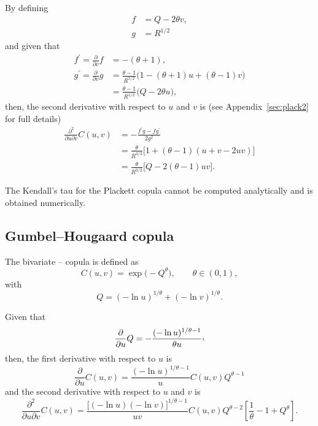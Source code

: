 \documentclass{article}
\def\ccom{\raisebox{.45ex}{\textrm{,}}}
\begin{document}
By defining
\begin{align}
    f &= Q - 2 \theta v,\\
    g &= R^{1/2}
\end{align}
and given that
\begin{align}
    f^\prime = \frac{\partial}{\partial v} f &= -(\theta + 1),\\
    g^\prime = \frac{\partial}{\partial v} g &= \frac{\theta-1}{R^{1/2}} \Big(
        1 - (\theta+1) u + (\theta-1) v \Big)
                \nonumber\\
         &= \frac{\theta-1}{R^{1/2}} \Big(Q - 2 \theta u \Big),
\end{align}
then, the second derivative with respect to $u$ and $v$ is 
  (see Appendix~\ref{sec:plack2} for full details)
\begin{align}
    \frac{\partial^2}{\partial u\partial v}C(u,v)
        &= - \frac{f^\prime g - fg^\prime}{2 g^2}
        \nonumber\\
        &= \frac\theta{R^{3/2}}\Big[
            1 + (\theta-1)(u+v-2uv)\Big]
        \nonumber\\
        &= \frac\theta{R^{3/2}}\Big[
            Q - 2(\theta-1)uv\Big].
\end{align}


The Kendall's tau for the Plackett copula cannot be computed analytically
  and is obtained numerically.




\subsection*{Gumbel--Hougaard copula}
The bivariate \cite{Gumbel60}--\cite{Hougaard86} copula is defined as
\begin{equation}
    C(u,v)= \exp\Big(-Q^\theta \Big), \qquad \theta \in (0, 1),
\end{equation}
with 
\begin{equation}
    Q= (- \ln u)^{1/\theta} + (- \ln v)^{1/\theta}.
\end{equation}

Given that
\begin{equation}
    \frac{\partial}{\partial u}Q
        = -\frac{(- \ln u)^{1/\theta-1}}{\theta u}\ccom
\end{equation}
then, the first derivative with respect to $u$ is 
\begin{equation}
    \frac{\partial}{\partial u}C(u,v)
    = \frac{ (-\ln u)^{1/\theta - 1} }u C(u, v) Q^{\theta-1}
    \label{eq:GHder}
\end{equation}
and the second derivative with respect to $u$ and $v$ is 
\begin{equation}
    \frac{\partial^2}{\partial u\partial v}C(u,v)
        = \frac{ \Big[ (-\ln u)(-\ln v) \Big]^{1/\theta - 1} }{uv}
            C(u, v) Q^{\theta-2}
            \left[\frac1\theta -1 + Q^\theta\right].
\end{equation}
\end{document}
